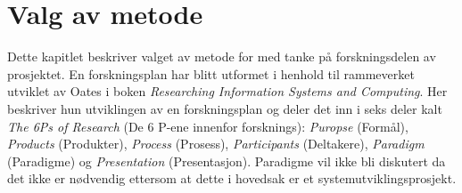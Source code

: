 \chapter{Valg av metode}
Dette kapitlet beskriver valget av metode for med tanke på forskningsdelen av prosjektet. En forskningsplan har blitt utformet i henhold til rammeverket utviklet av Oates \cite{oatesResearchingInformationSystems2013} i boken \textit{Researching Information Systems and Computing}. Her beskriver hun utviklingen av en forskningsplan og deler det inn i seks deler kalt \textit{The 6Ps of Research} (De 6 P-ene innenfor forsknings): \textit{Puropse} (Formål), \textit{Products} (Produkter), \textit{Process} (Prosess), \textit{Participants} (Deltakere), \textit{Paradigm} (Paradigme) og \textit{Presentation} (Presentasjon). Paradigme vil ikke bli diskutert da det ikke er nødvendig ettersom at dette i hovedsak er et systemutviklingsprosjekt.

